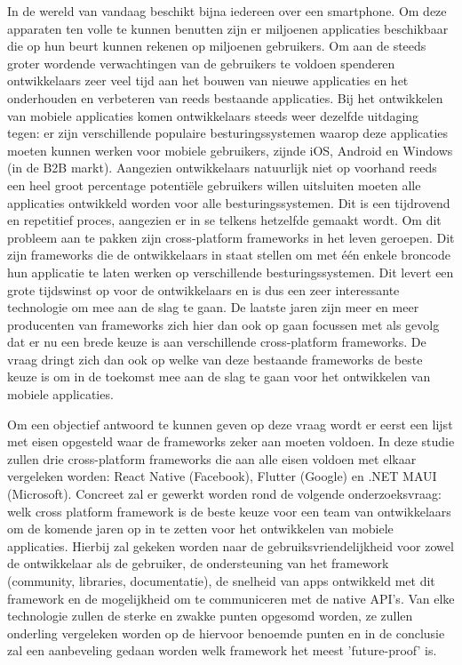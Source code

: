 In de wereld van vandaag beschikt bijna iedereen over een smartphone. Om deze apparaten ten volle te kunnen benutten zijn er miljoenen applicaties beschikbaar die op hun beurt kunnen rekenen op miljoenen gebruikers. Om aan de steeds groter wordende verwachtingen van de gebruikers te voldoen spenderen ontwikkelaars zeer veel tijd aan het bouwen van nieuwe applicaties en het onderhouden en verbeteren van reeds bestaande applicaties. Bij het ontwikkelen van mobiele applicaties komen ontwikkelaars steeds weer dezelfde uitdaging tegen: er zijn verschillende populaire besturingssystemen waarop deze applicaties moeten kunnen werken voor mobiele gebruikers, zijnde iOS, Android en Windows (in de B2B markt). Aangezien ontwikkelaars natuurlijk niet op voorhand reeds een heel groot percentage potentiële gebruikers willen uitsluiten moeten alle applicaties ontwikkeld worden voor alle besturingssystemen. Dit is een tijdrovend en repetitief proces, aangezien er in se telkens hetzelfde gemaakt wordt. Om dit probleem aan te pakken zijn cross-platform frameworks in het leven geroepen. Dit zijn frameworks die de ontwikkelaars in staat stellen om met één enkele broncode hun applicatie te laten werken op verschillende besturingssystemen. Dit levert een grote tijdswinst op voor de ontwikkelaars en is dus een zeer interessante technologie om mee aan de slag te gaan. De laatste jaren zijn meer en meer producenten van frameworks zich hier dan ook op gaan focussen met als gevolg dat er nu een brede keuze is aan verschillende cross-platform frameworks. De vraag dringt zich dan ook op welke van deze bestaande frameworks de beste keuze is om in de toekomst mee aan de slag te gaan voor het ontwikkelen van mobiele applicaties.

Om een objectief antwoord te kunnen geven op deze vraag wordt er eerst een lijst met eisen opgesteld waar de frameworks zeker aan moeten voldoen. In deze studie zullen drie cross-platform frameworks die aan alle eisen voldoen met elkaar vergeleken worden: React Native (Facebook), Flutter (Google) en .NET MAUI (Microsoft). Concreet zal er gewerkt worden rond de volgende onderzoeksvraag: welk cross platform framework is de beste keuze voor een team van ontwikkelaars om de komende jaren op in te zetten voor het ontwikkelen van mobiele applicaties. Hierbij zal gekeken worden naar de gebruiksvriendelijkheid voor zowel de ontwikkelaar als de gebruiker, de ondersteuning van het framework (community, libraries, documentatie), de snelheid van apps ontwikkeld met dit framework en de mogelijkheid om te communiceren met de native API's. Van elke technologie zullen de sterke en zwakke punten opgesomd worden, ze zullen onderling vergeleken worden op de hiervoor benoemde punten en in de conclusie zal een aanbeveling gedaan worden welk framework het meest 'future-proof' is. 


%